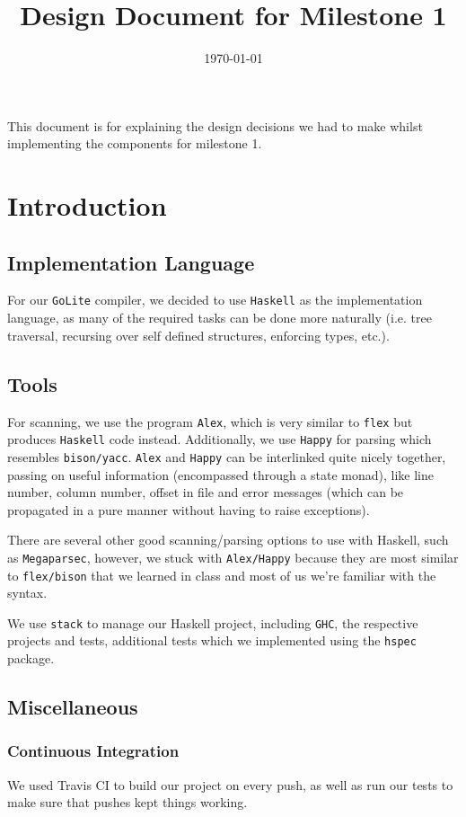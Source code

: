 \documentclass[11pt]{article}
\date{\today}
\title{Design Document for Milestone 1}
\begin{document}
\maketitle
\tableofcontents

This document is for explaining the design decisions we had to make
whilst implementing the components for milestone 1.
\section{Introduction}
\label{sec:org6458650}
\subsection{Implementation Language}
\label{sec:orgddfcda9}
For our \texttt{GoLite} compiler, we decided to use \texttt{Haskell} as the
implementation language, as many of the required tasks can be done
more naturally (i.e. tree traversal, recursing over self defined
structures, enforcing types, etc.).
\subsection{Tools}
\label{sec:org3d696f6}
For scanning, we use the program \texttt{Alex}, which is very similar to \texttt{flex}
but produces \texttt{Haskell} code instead. Additionally, we use \texttt{Happy} for
parsing which resembles \texttt{bison/yacc}. \texttt{Alex} and \texttt{Happy} can be interlinked
quite nicely together, passing on useful information (encompassed
through a state monad), like line number, column number, offset in
file and error messages (which can be propagated in a pure manner
without having to raise exceptions).

There are several other good scanning/parsing options to use with
Haskell, such as \texttt{Megaparsec}, however, we stuck with \texttt{Alex/Happy} because
they are most similar to \texttt{flex/bison} that we learned in class and most
of us we're familiar with the syntax.

We use \texttt{stack} to manage our Haskell project, including \texttt{GHC}, the
respective projects and tests, additional tests which we implemented
using the \texttt{hspec} package.
\subsection{Miscellaneous}
\label{sec:orgcbf3ac3}
\subsubsection{Continuous Integration}
\label{sec:orgd94828c}
We used Travis CI to build our project on every push, as well as
run our tests to make sure that pushes kept things working.
\end{document}
